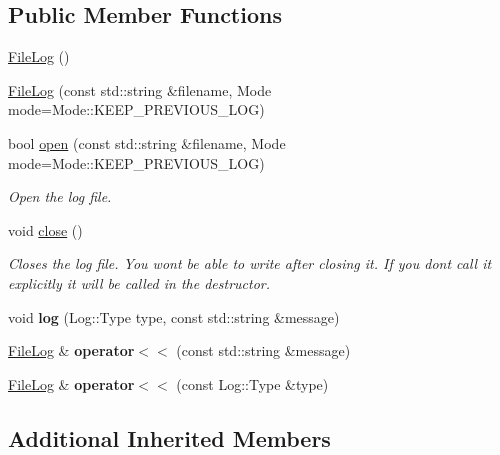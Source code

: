 \subsection*{Public Member Functions}
\begin{DoxyCompactItemize}
\item 
\hyperlink{classzt_1_1_file_log_a9641437081c1f57fb9f439e077dd97f7}{File\+Log} ()
\item 
\hyperlink{classzt_1_1_file_log_ac54d6900bdf714cfb297e066651905a3}{File\+Log} (const std\+::string \&filename, Mode mode=Mode\+::\+K\+E\+E\+P\+\_\+\+P\+R\+E\+V\+I\+O\+U\+S\+\_\+\+L\+OG)
\item 
bool \hyperlink{classzt_1_1_file_log_a4ef54c06277e13646f014d77a62fa2d6}{open} (const std\+::string \&filename, Mode mode=Mode\+::\+K\+E\+E\+P\+\_\+\+P\+R\+E\+V\+I\+O\+U\+S\+\_\+\+L\+OG)
\begin{DoxyCompactList}\small\item\em Open the log file. \end{DoxyCompactList}\item 
\mbox{\label{classzt_1_1_file_log_a363d3a84506f56ac0dae23765ec32a04}} 
void \hyperlink{classzt_1_1_file_log_a363d3a84506f56ac0dae23765ec32a04}{close} ()
\begin{DoxyCompactList}\small\item\em Closes the log file. You won\textquotesingle{}t be able to write after closing it. If you don\textquotesingle{}t call it explicitly it will be called in the destructor. \end{DoxyCompactList}\item 
\mbox{\label{classzt_1_1_file_log_a7b17c16a57f5b610416a685f7e9b2bfb}} 
void {\bfseries log} (Log\+::\+Type type, const std\+::string \&message)
\item 
\mbox{\label{classzt_1_1_file_log_a02ae73fbaf82e487d17ca6a6a1462c46}} 
\hyperlink{classzt_1_1_file_log}{File\+Log} \& {\bfseries operator$<$$<$} (const std\+::string \&message)
\item 
\mbox{\label{classzt_1_1_file_log_af578e4259455ae5e304b0dba1f2bb097}} 
\hyperlink{classzt_1_1_file_log}{File\+Log} \& {\bfseries operator$<$$<$} (const Log\+::\+Type \&type)
\end{DoxyCompactItemize}
\subsection*{Additional Inherited Members}


